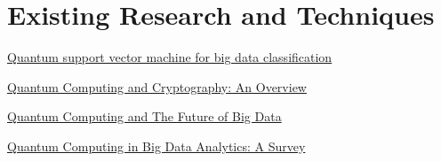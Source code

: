 \section{Existing Research and Techniques} \label{Sec: Existing Research and Techniques}

\begin{framed}
    \href{https://arxiv.org/pdf/1307.0471.pdf}{Quantum support vector machine for big data classification}

    \href{https://link.springer.com/chapter/10.1007/978-3-319-63639-9_4}{Quantum Computing and Cryptography: An Overview}

    \href{https://isg-one.com/articles/quantum-computing-and-the-future-of-big-data}{Quantum Computing and The Future of Big Data}

    \href{https://ieeexplore.ieee.org/document/7876324}{Quantum Computing in Big Data Analytics: A Survey}

\end{framed}

